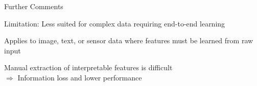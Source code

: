 \documentclass[10pt,compress,t,notes=noshow,xcolor=table]{beamer}
\begin{document}
\begin{framev}[align=top]{Further Comments}
\begin{itemizeM}
\item<2-> Limitation: Less suited for complex data requiring end-to-end learning
\begin{itemizeS}
\item Applies to image, text, or sensor data where features must be learned from raw input
\item Manual extraction of interpretable features is difficult\\
$\Rightarrow$ Information loss and lower performance
\end{itemizeS}
\end{itemizeM}
\end{framev}
\end{document}
